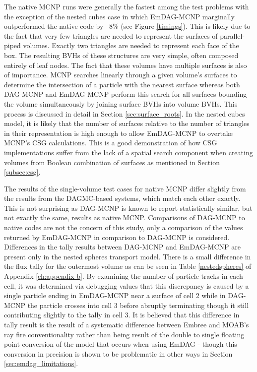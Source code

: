 The native MCNP runs were generally the fastest among the test problems with the
exception of the nested cubes case in which EmDAG-MCNP marginally outperformed
the native code by ~8\% (see Figure \ref{timings}). This is likely due to the
fact that very few triangles are needed to represent the surfaces of
parallel-piped volumes. Exactly two triangles are needed to represent each face
of the box. The resulting BVHs of these structures are very simple, often
composed entirely of leaf nodes.  The fact that these volumes have multiple
surfaces is also of importance. MCNP searches linearly through a given volume's
surfaces to determine the intersection of a particle with the nearest surface
whereas both DAG-MCNP and EmDAG-MCNP perform this search for all surfaces
bounding the volume simultaneously by joining surface BVHs into volume
BVHs. This process is discussed in detail in Section \ref{sec:surface_roots}. In
the nested cubes model, it is likely that the number of surfaces relative to the
number of triangles in their representation is high enough to allow EmDAG-MCNP
to overtake MCNP's CSG calculations. This is a good demonstration of how CSG
implementations suffer from the lack of a spatial search component when creating
volumes from Boolean combination of surfaces as mentioned in Section
\ref{subsec:csg}.

The results of the single-volume test cases for native MCNP differ slightly from
the results from the DAGMC-based systems, which match each other exactly. This
is not surprising as DAG-MCNP is known to report statistically similar, but not
exactly the same, results as native MCNP. Comparisons of DAG-MCNP to native
codes are not the concern of this study, only a comparison of the values
returned by EmDAG-MCNP in comparison to DAG-MCNP is considered. Differences in
the tally results between DAG-MCNP and EmDAG-MCNP are present only in the nested
spheres transport model. There is a small difference in the flux tally for the
outermost volume as can be seen in Table \ref{nestedspheres} of Appendix
\ref{ch:appendix-b}. By examining the number of particle tracks in each cell, it
was determined via debugging values that this discrepancy is caused by a single
particle ending in EmDAG-MCNP near a surface of cell 2 while in DAG-MCNP the
particle crosses into cell 3 before abruptly terminating though it still
contributing slightly to the tally in cell 3. It is believed that this
difference in tally result is the result of a systematic difference between
Embree and MOAB's ray fire conventionality rather than being result of the
double to single floating point conversion of the model that occurs when using
EmDAG - though this conversion in precision is shown to be problematic in other
ways in Section \ref{sec:emdag_limitations}.

